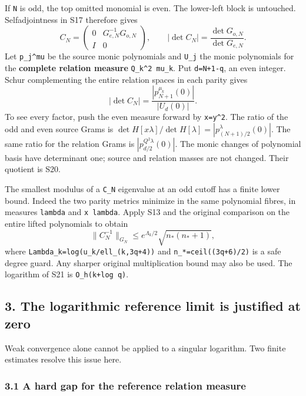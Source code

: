 \documentclass[11pt]{article}
\begin{document}
If \texttt{N} is odd, the top omitted monomial is even. The lower-left block is untouched. Selfadjointness in S17 therefore gives \[
 C_N=\begin{pmatrix}0&G_{e,N}^{-1}G_{o,N}\\I&0\end{pmatrix},
 \qquad |\det C_N|=\frac{\det G_{o,N}}{\det G_{e,N}}.               \tag{S19}
\] Let \texttt{p\_j\^{}mu} be the source monic polynomials and \texttt{U\_j} the monic polynomials for the \textbf{complete relation measure} \texttt{Q\_k\^{}2\ mu\_k}. Put \texttt{d=N+1-q}, an even integer. Schur complementing the entire relation spaces in each parity gives \[
 \boxed{|\det C_N|=\frac{|p_{N+1}^{\mu_k}(0)|}{|U_d(0)|}.}         \tag{S20}
\] To see every factor, push the even measure forward by \texttt{x=y\^{}2}. The ratio of the odd and even source Grams is \(\det H[x\lambda]/\det H[\lambda]=|p_{(N+1)/2}^{\lambda}(0)|\). The same ratio for the relation Grams is \(|p_{d/2}^{Q^2\lambda}(0)|\). The monic changes of polynomial basis have determinant one; source and relation masses are not changed. Their quotient is S20.

The smallest modulus of a \texttt{C\_N} eigenvalue at an odd cutoff has a finite lower bound. Indeed the two parity metrics minimize in the same polynomial fibres, in measures \texttt{lambda} and \texttt{x\ lambda}. Apply S13 and the original comparison on the entire lifted polynomials to obtain \[
 \|C_N^{-1}\|_{G_N}
 \le e^{\Lambda_k/2}\sqrt{n_* (n_*+1)},                            \tag{S21}
\] where \nolinkurl{Lambda_k=log(u_k/ell_(k,3q+4))} and \nolinkurl{n_*=ceil((3q+6)/2)} is a safe degree guard. Any sharper original multiplication bound may also be used. The logarithm of S21 is \texttt{O\_h(k+log\ q)}.

\subsection{3. The logarithmic reference limit is justified at zero}\label{the-logarithmic-reference-limit-is-justified-at-zero}

Weak convergence alone cannot be applied to a singular logarithm. Two finite estimates resolve this issue here.

\subsubsection{3.1 A hard gap for the reference relation measure}\label{a-hard-gap-for-the-reference-relation-measure}
\end{document}
